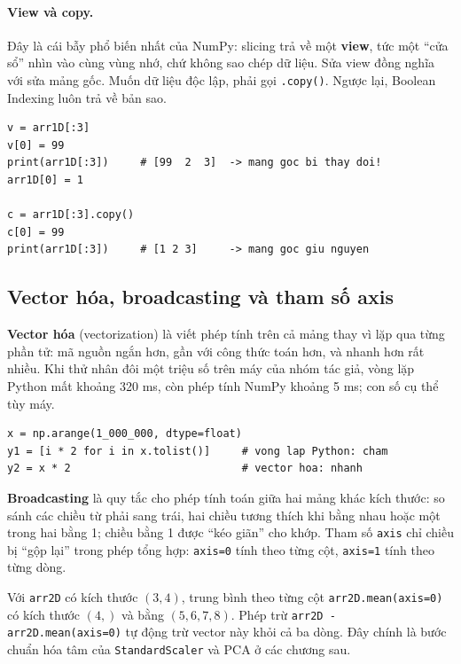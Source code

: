 \paragraph{View và copy.} Đây là cái bẫy phổ biến nhất của NumPy: slicing trả về một \textbf{view}, tức một ``cửa sổ'' nhìn vào cùng vùng nhớ, chứ không sao chép dữ liệu. Sửa view đồng nghĩa với sửa mảng gốc. Muốn dữ liệu độc lập, phải gọi \texttt{.copy()}. Ngược lại, Boolean Indexing luôn trả về bản sao.

\begin{lstlisting}[caption={Slicing tạo view, không sao chép dữ liệu}]
v = arr1D[:3]
v[0] = 99
print(arr1D[:3])     # [99  2  3]  -> mang goc bi thay doi!
arr1D[0] = 1

c = arr1D[:3].copy()
c[0] = 99
print(arr1D[:3])     # [1 2 3]     -> mang goc giu nguyen
\end{lstlisting}

\subsection{Vector hóa, broadcasting và tham số axis}

\textbf{Vector hóa} (vectorization) là viết phép tính trên cả mảng thay vì lặp qua từng phần tử: mã nguồn ngắn hơn, gần với công thức toán hơn, và nhanh hơn rất nhiều. Khi thử nhân đôi một triệu số trên máy của nhóm tác giả, vòng lặp Python mất khoảng 320 ms, còn phép tính NumPy khoảng 5 ms; con số cụ thể tùy máy.

\begin{lstlisting}[caption={So sánh vòng lặp Python với vector hóa}]
x = np.arange(1_000_000, dtype=float)
y1 = [i * 2 for i in x.tolist()]     # vong lap Python: cham
y2 = x * 2                           # vector hoa: nhanh
\end{lstlisting}

\textbf{Broadcasting} là quy tắc cho phép tính toán giữa hai mảng khác kích thước: so sánh các chiều từ phải sang trái, hai chiều tương thích khi bằng nhau hoặc một trong hai bằng 1; chiều bằng 1 được ``kéo giãn'' cho khớp. Tham số \texttt{axis} chỉ chiều bị ``gộp lại'' trong phép tổng hợp: \texttt{axis=0} tính theo từng cột, \texttt{axis=1} tính theo từng dòng.

\begin{example}
Với \texttt{arr2D} có kích thước $(3, 4)$, trung bình theo từng cột \texttt{arr2D.mean(axis=0)} có kích thước $(4,)$ và bằng $(5, 6, 7, 8)$. Phép trừ \texttt{arr2D - arr2D.mean(axis=0)} tự động trừ vector này khỏi cả ba dòng. Đây chính là bước chuẩn hóa tâm của \texttt{StandardScaler} và PCA ở các chương sau.
\end{example}

